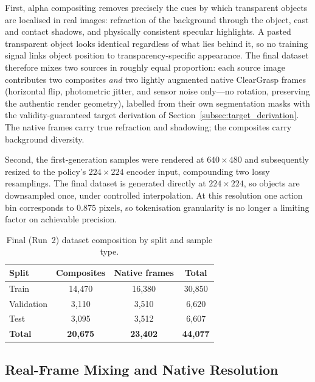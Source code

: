 First, alpha compositing removes precisely the cues by which transparent
objects are localised in real images: refraction of the background through the
object, cast and contact shadows, and physically consistent specular
highlights. A pasted transparent object looks identical regardless of what
lies behind it, so no training signal links object position to
transparency-specific appearance. The final dataset therefore mixes two
sources in roughly equal proportion: each source image contributes two
composites \emph{and} two lightly augmented native ClearGrasp frames
(horizontal flip, photometric jitter, and sensor noise only---no rotation,
preserving the authentic render geometry), labelled from their own
segmentation masks with the validity-guaranteed target derivation of
Section~\ref{subsec:target_derivation}. The native frames carry true
refraction and shadowing; the composites carry background diversity.
 
Second, the first-generation samples were rendered at $640 \times 480$ and
subsequently resized to the policy's $224 \times 224$ encoder input,
compounding two lossy resamplings. The final dataset is generated directly at
$224 \times 224$, so objects are downsampled once, under controlled
interpolation. At this resolution one action bin corresponds to $0.875$
pixels, so tokenisation granularity is no longer a limiting factor on
achievable precision.
 
\begin{table}[htbp]
    \centering
    \caption{Final (Run~2) dataset composition by split and sample type.}
    \label{tab:run2_dataset}
    \begin{tabular}{lccc}
        \toprule
        \textbf{Split} & \textbf{Composites} & \textbf{Native frames} & \textbf{Total} \\
        \midrule
        Train      & 14{,}470 & 16{,}380 & 30{,}850 \\
        Validation &  3{,}110 &  3{,}510 &  6{,}620 \\
        Test       &  3{,}095 &  3{,}512 &  6{,}607 \\
        \midrule
        \textbf{Total} & \textbf{20{,}675} & \textbf{23{,}402} & \textbf{44{,}077} \\
        \bottomrule
    \end{tabular}
\end{table}
 

\subsection{Real-Frame Mixing and Native Resolution}
\label{subsec:realframe_mixing}
 
